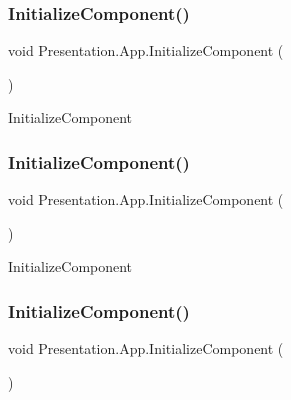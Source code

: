 \subsubsection{\texorpdfstring{Initialize\+Component()}{InitializeComponent()}\hspace{0.1cm}{\footnotesize\ttfamily [1/4]}}
{\footnotesize\ttfamily void Presentation.\+App.\+Initialize\+Component (\begin{DoxyParamCaption}{ }\end{DoxyParamCaption})}



Initialize\+Component 

\mbox{\label{class_presentation_1_1_app_a7460ac4ca59a6b42035e0415cff24413}} 
\subsubsection{\texorpdfstring{Initialize\+Component()}{InitializeComponent()}\hspace{0.1cm}{\footnotesize\ttfamily [2/4]}}
{\footnotesize\ttfamily void Presentation.\+App.\+Initialize\+Component (\begin{DoxyParamCaption}{ }\end{DoxyParamCaption})}



Initialize\+Component 

\mbox{\label{class_presentation_1_1_app_a7460ac4ca59a6b42035e0415cff24413}} 
\subsubsection{\texorpdfstring{Initialize\+Component()}{InitializeComponent()}\hspace{0.1cm}{\footnotesize\ttfamily [3/4]}}
{\footnotesize\ttfamily void Presentation.\+App.\+Initialize\+Component (\begin{DoxyParamCaption}{ }\end{DoxyParamCaption})}



